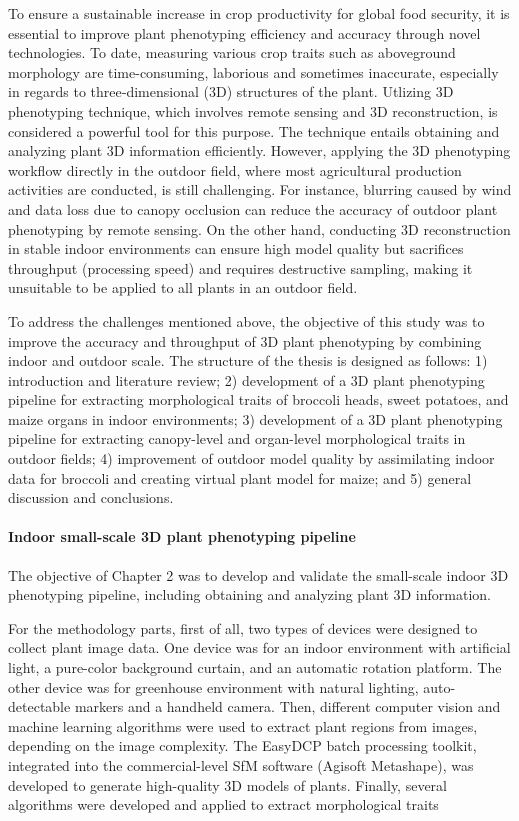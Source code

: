 \begin{eabstract}
  To ensure a sustainable increase in crop productivity for global food security, it is essential to improve plant phenotyping efficiency and accuracy through novel technologies. To date, measuring various crop traits such as aboveground morphology are time-consuming, laborious and sometimes inaccurate, especially in regards to three‐dimensional (3D) structures of the plant. Utlizing 3D phenotyping technique, which involves remote sensing and 3D reconstruction, is considered a powerful tool for this purpose. The technique entails obtaining and analyzing plant 3D information efficiently. However, applying the 3D phenotyping workflow directly in the outdoor field, where most agricultural production activities are conducted, is still challenging. For instance, blurring caused by wind and data loss due to canopy occlusion can reduce the accuracy of outdoor plant phenotyping by remote sensing. On the other hand, conducting 3D reconstruction in stable indoor environments can ensure high model quality but sacrifices throughput (processing speed) and requires destructive sampling, making it unsuitable to be applied to all plants in an outdoor field.
  
  To address the challenges mentioned above, the objective of this study was to improve the accuracy and throughput of 3D plant phenotyping by combining indoor and outdoor scale. The structure of the thesis is designed as follows: 1) introduction and literature review; 2) development of a 3D plant phenotyping pipeline for extracting morphological traits of broccoli heads, sweet potatoes, and maize organs in indoor environments; 3) development of a 3D plant phenotyping pipeline for extracting canopy-level and organ-level morphological traits in outdoor fields; 4) improvement of outdoor model quality by assimilating indoor data for broccoli and creating virtual plant model for maize; and 5) general discussion and conclusions.
  
 \paragraph{Indoor small-scale 3D plant phenotyping pipeline}

  The objective of Chapter 2 was to develop and validate the small-scale indoor 3D phenotyping pipeline, including obtaining and analyzing plant 3D information.

  For the methodology parts, first of all, two types of devices were designed to collect plant image data. One device was for an indoor environment with artificial light, a pure-color background curtain, and an automatic rotation platform. The other device was for greenhouse environment with natural lighting, auto-detectable markers and a handheld camera. Then, different computer vision and machine learning algorithms were used to extract plant regions from images, depending on the image complexity. The EasyDCP batch processing toolkit, integrated into the commercial-level SfM software (Agisoft Metashape), was developed to generate high-quality 3D models of plants. Finally, several algorithms were developed and applied to extract morphological traits


\end{eabstract}
